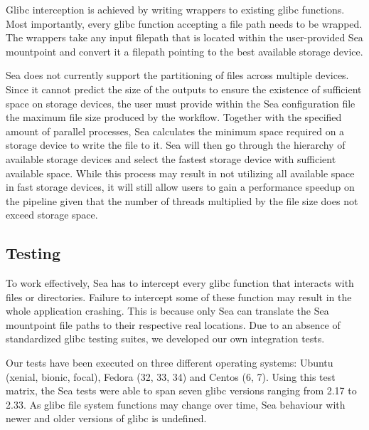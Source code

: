 \documentclass[10pt,journal,compsoc]{IEEEtran}
\newcommand{\todo}[1]{\marginpar{\parbox{18mm}{\flushleft\tiny\color{red}\textbf{TODO}: #1}}}
\begin{document}
Glibc interception is achieved by writing wrappers to existing glibc functions.
Most importantly, every glibc function accepting a file path needs to be
wrapped. The wrappers take any input filepath that is located within the
user-provided Sea mountpoint and convert it a filepath pointing to the best
available storage device.

Sea does not currently support the partitioning of files across multiple
devices. Since it cannot predict the size of the outputs to ensure the existence
of sufficient space on storage devices, the user must provide within the Sea
configuration file the maximum file size produced by the workflow. Together with
the specified amount of parallel processes, Sea calculates the minimum space
required on a storage device to write the file to it.
Sea will then go through the hierarchy of available storage devices and select
the fastest storage device with sufficient available space. While this process
may result in not utilizing all available space in fast storage devices, it will
still allow users to gain a performance speedup on the pipeline given that the
number of threads multiplied by the file size does not exceed storage space.

\subsection{Testing}
To work effectively, Sea has to intercept every glibc function that interacts with files or
directories. Failure to intercept some of these function may result in the whole application
crashing. This is because only Sea can translate the Sea mountpoint file paths to their
respective real locations. Due to an absence of standardized glibc testing suites,
we developed our own integration tests.

Our tests have been executed on three different operating systems: Ubuntu (xenial, bionic, focal),
Fedora (32, 33, 34) and Centos (6, 7). Using this test matrix, the Sea tests were able to span seven glibc
versions ranging from 2.17 to 2.33. As glibc file system functions may change over time, Sea behaviour with
newer and older versions of glibc is undefined. 
\end{document}
